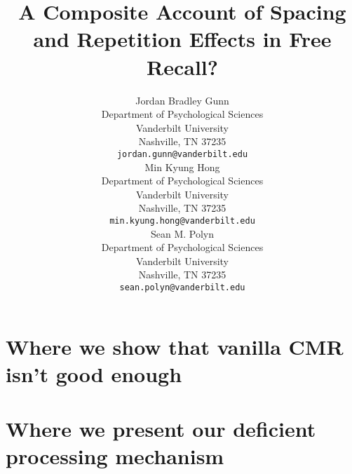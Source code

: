 \documentclass{article}
\title{A Composite Account of Spacing and Repetition Effects in Free Recall?}
\author{
  Jordan Bradley Gunn \\
  Department of Psychological Sciences \\
  Vanderbilt University \\
  Nashville, TN 37235 \\
  \texttt{jordan.gunn@vanderbilt.edu} \\
  \AND
  Min Kyung Hong \\
  Department of Psychological Sciences\\
  Vanderbilt University\\
  Nashville, TN 37235 \\
  \texttt{min.kyung.hong@vanderbilt.edu} \\
  \AND
  Sean M. Polyn \\
  Department of Psychological Sciences\\
  Vanderbilt University\\
  Nashville, TN 37235 \\
  \texttt{sean.polyn@vanderbilt.edu} \\
}
\begin{document}
\maketitle

\begin{abstract}

\end{abstract}




\section{Where we show that vanilla CMR isn't good enough}


\section{Where we present our deficient processing mechanism}




\end{document}
